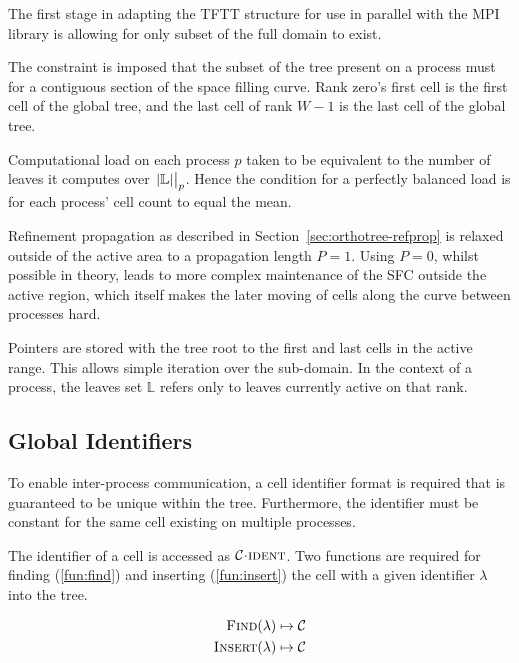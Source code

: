\documentclass[twoside]{IIBproject}
\newcommand{\acc}{{\mkern 0.5mu\cdot\mkern 0.5mu}}
\numberwithin{figure}{section}
\begin{document}
        The first stage in adapting the TFTT structure for use in parallel with the MPI library is allowing for only subset of the full domain to exist. 

        The constraint is imposed that the subset of the tree present on a process must for a contiguous section of the space filling curve. Rank zero's first cell is the first cell of the global tree, and the last cell of  rank $W-1$ is the last cell of the global tree. 

        Computational load on each process $p$ taken to be equivalent to the number of leaves it computes over $\eval{\abs{\mathbb{L}}}_p$. Hence the condition for a perfectly balanced load is for each process' cell count to equal the mean.

        Refinement propagation as described in Section~\ref{sec:orthotree-refprop} is relaxed outside of the active area to a propagation length $P=1$. Using $P=0$, whilst possible in theory, leads to more complex maintenance of the SFC outside the active region, which itself makes the later moving of cells along the curve between processes hard. 

        Pointers are stored with the tree root to the first and last cells in the active range. This allows simple iteration over the sub-domain. In the context of a process, the leaves set $\mathbb{L}$ refers only to leaves currently active on that rank.



    \subsection{Global Identifiers} %
        \label{sec:globalid}

        To enable inter-process communication, a cell identifier format is required that is guaranteed to be unique within the tree. Furthermore, the identifier must be constant for the same cell existing on multiple processes.

        The identifier of a cell is accessed as $\mathcal{C}\acc\textproc{ident}$. Two functions are required for finding (\ref{fun:find}) and inserting (\ref{fun:insert}) the cell with a given identifier $\lambda$ into the tree.

        \begin{align}
            \label{fun:find}
            \textproc{Find}(\lambda) \mapsto \mathcal{C} \\
            \label{fun:insert}
            \textproc{Insert}(\lambda) \mapsto \mathcal{C}
        \end{align}
\end{document}
